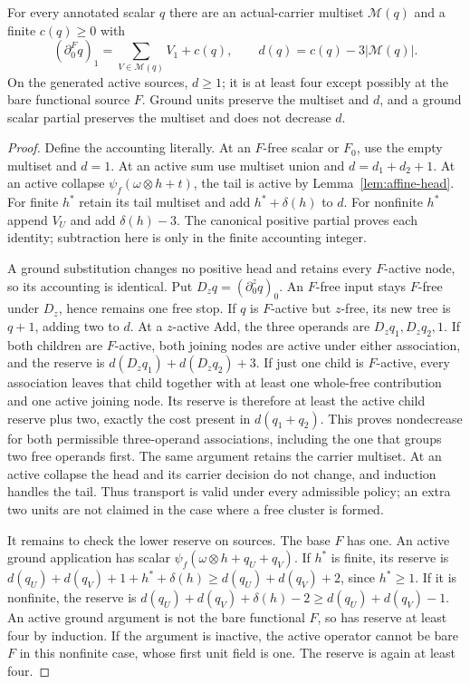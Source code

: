 \begin{lemma}\label{lem:reserve}
For every annotated scalar $q$ there are an actual-carrier multiset
$\mathcal M(q)$ and a finite $c(q)\ge0$ with
\[
 (\partial^F_0q)_1=\sum_{V\in\mathcal M(q)}V_1+c(q),\qquad
 d(q)=c(q)-3|\mathcal M(q)|.
\]
On the generated active sources, $d\ge1$; it is at least four except
possibly at the bare functional source $F$.  Ground units preserve the
multiset and $d$, and a ground scalar partial preserves the multiset and
does not decrease $d$.
\end{lemma}
\begin{proof}
Define the accounting literally.  At an $F$-free scalar or $F_0$, use the
empty multiset and $d=1$.  At an active sum use multiset union and
$d=d_1+d_2+1$.  At an active collapse $\psi_f(\omega\otimes h+t)$, the
tail is active by Lemma~\ref{lem:affine-head}.  For finite $h^*$ retain its
tail multiset and add $h^*+\delta(h)$ to $d$.  For nonfinite $h^*$ append
$V_U$ and add $\delta(h)-3$.  The canonical positive partial proves each
identity; subtraction here is only in the finite accounting integer.

A ground substitution changes no positive head and retains every
$F$-active node, so its accounting is identical. Put
$D_zq=(\partial^z_0q)_0$. An $F$-free input stays $F$-free under
$D_z$, hence remains one free stop. If $q$ is $F$-active but $z$-free,
its new tree is $q+1$, adding two to $d$. At a $z$-active Add, the
three operands are $D_zq_1,D_zq_2,1$. If both children are $F$-active,
both joining nodes are active under either association, and the reserve
is $d(D_zq_1)+d(D_zq_2)+3$. If just one child is $F$-active, every
association leaves that child together with at least one whole-free
contribution and one active joining node. Its reserve is therefore at
least the active child reserve plus two, exactly the cost present in
$d(q_1+q_2)$. This proves nondecrease for both permissible three-operand
associations, including the one that groups two free operands first.
The same argument retains the carrier multiset. At an active collapse
the head and its carrier decision do not change, and induction handles
the tail. Thus transport is valid under every admissible policy; an
extra two units are not claimed in the case where a free cluster is
formed.

It remains to check the lower reserve on sources.  The base $F$ has one.
An active ground application has scalar $\psi_f(\omega\otimes h+q_U+q_V)$.
If $h^*$ is finite, its reserve is
$d(q_U)+d(q_V)+1+h^*+\delta(h)\ge d(q_U)+d(q_V)+2$,
since $h^*\ge1$.  If it is nonfinite, the reserve is
$d(q_U)+d(q_V)+\delta(h)-2\ge d(q_U)+d(q_V)-1$.
An active ground argument is not the bare functional $F$, so has reserve
at least four by induction.  If the argument is inactive, the active operator
cannot be bare $F$ in this nonfinite case, whose first unit field is one.
The reserve is again at least four.


\end{proof}
